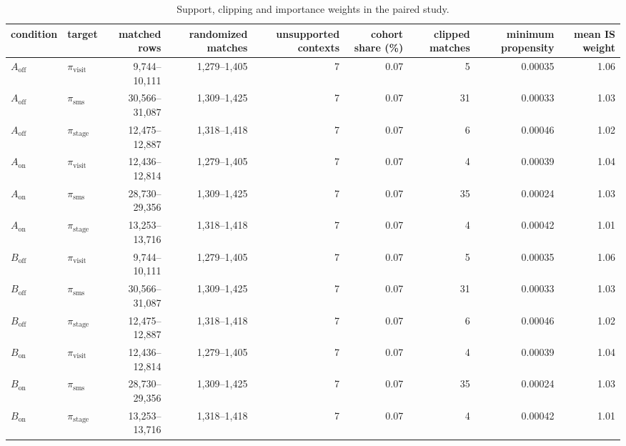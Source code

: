 \begin{table}[!htbp]
\centering
\caption{Support, clipping and importance weights in the paired study.}
\label{tab:campaignsupport}
\small
\begin{adjustbox}{max width=\linewidth}
\begin{tabular}{llrrrrrrr}
\toprule
condition & target & matched rows & randomized matches & unsupported contexts & cohort share (\%) & clipped matches & minimum propensity & mean IS weight \\
\midrule
$A_{\mathrm{off}}$ & $\pi_{\mathrm{visit}}$ & 9,744--10,111 & 1,279--1,405 & 7 & 0.07 & 5 & 0.00035 & 1.06 \\
$A_{\mathrm{off}}$ & $\pi_{\mathrm{sms}}$ & 30,566--31,087 & 1,309--1,425 & 7 & 0.07 & 31 & 0.00033 & 1.03 \\
$A_{\mathrm{off}}$ & $\pi_{\mathrm{stage}}$ & 12,475--12,887 & 1,318--1,418 & 7 & 0.07 & 6 & 0.00046 & 1.02 \\
$A_{\mathrm{on}}$ & $\pi_{\mathrm{visit}}$ & 12,436--12,814 & 1,279--1,405 & 7 & 0.07 & 4 & 0.00039 & 1.04 \\
$A_{\mathrm{on}}$ & $\pi_{\mathrm{sms}}$ & 28,730--29,356 & 1,309--1,425 & 7 & 0.07 & 35 & 0.00024 & 1.03 \\
$A_{\mathrm{on}}$ & $\pi_{\mathrm{stage}}$ & 13,253--13,716 & 1,318--1,418 & 7 & 0.07 & 4 & 0.00042 & 1.01 \\
$B_{\mathrm{off}}$ & $\pi_{\mathrm{visit}}$ & 9,744--10,111 & 1,279--1,405 & 7 & 0.07 & 5 & 0.00035 & 1.06 \\
$B_{\mathrm{off}}$ & $\pi_{\mathrm{sms}}$ & 30,566--31,087 & 1,309--1,425 & 7 & 0.07 & 31 & 0.00033 & 1.03 \\
$B_{\mathrm{off}}$ & $\pi_{\mathrm{stage}}$ & 12,475--12,887 & 1,318--1,418 & 7 & 0.07 & 6 & 0.00046 & 1.02 \\
$B_{\mathrm{on}}$ & $\pi_{\mathrm{visit}}$ & 12,436--12,814 & 1,279--1,405 & 7 & 0.07 & 4 & 0.00039 & 1.04 \\
$B_{\mathrm{on}}$ & $\pi_{\mathrm{sms}}$ & 28,730--29,356 & 1,309--1,425 & 7 & 0.07 & 35 & 0.00024 & 1.03 \\
$B_{\mathrm{on}}$ & $\pi_{\mathrm{stage}}$ & 13,253--13,716 & 1,318--1,418 & 7 & 0.07 & 4 & 0.00042 & 1.01 \\
\bottomrule
\end{tabular}
\end{adjustbox}
\end{table}
